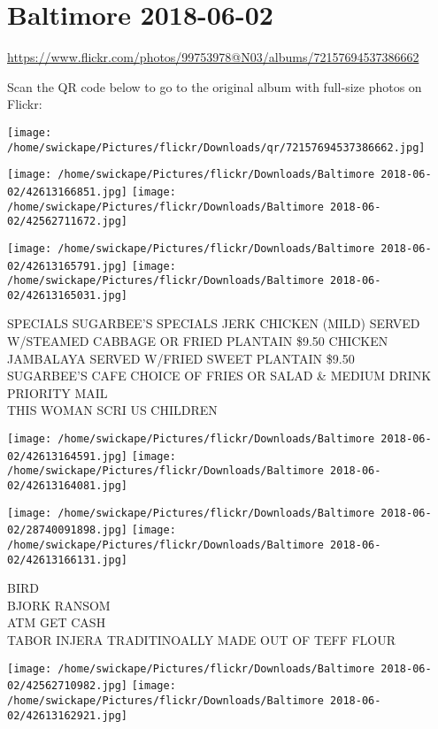 \documentclass[10pt,letterpaper]{article}
\title{}
\author{}
\date{}
\begin{document}
\section*{Baltimore 2018-06-02}

\url{https://www.flickr.com/photos/99753978@N03/albums/72157694537386662}

Scan the QR code below to go to the original album with full-size photos on Flickr:

\texttt{[image: /home/swickape/Pictures/flickr/Downloads/qr/72157694537386662.jpg]}
\pagebreak

\texttt{[image: /home/swickape/Pictures/flickr/Downloads/Baltimore 2018-06-02/42613166851.jpg]}
\texttt{[image: /home/swickape/Pictures/flickr/Downloads/Baltimore 2018-06-02/42562711672.jpg]}

\texttt{[image: /home/swickape/Pictures/flickr/Downloads/Baltimore 2018-06-02/42613165791.jpg]}
\texttt{[image: /home/swickape/Pictures/flickr/Downloads/Baltimore 2018-06-02/42613165031.jpg]}

SPECIALS SUGARBEE'S SPECIALS JERK CHICKEN (MILD) SERVED W/STEAMED CABBAGE OR FRIED PLANTAIN \$9.50 CHICKEN JAMBALAYA SERVED W/FRIED SWEET PLANTAIN \$9.50\\
SUGARBEE'S CAFE CHOICE OF FRIES OR SALAD \& MEDIUM DRINK\\
PRIORITY MAIL\\
THIS WOMAN SCRI US CHILDREN
\pagebreak

\texttt{[image: /home/swickape/Pictures/flickr/Downloads/Baltimore 2018-06-02/42613164591.jpg]}
\texttt{[image: /home/swickape/Pictures/flickr/Downloads/Baltimore 2018-06-02/42613164081.jpg]}

\texttt{[image: /home/swickape/Pictures/flickr/Downloads/Baltimore 2018-06-02/28740091898.jpg]}
\texttt{[image: /home/swickape/Pictures/flickr/Downloads/Baltimore 2018-06-02/42613166131.jpg]}

BIRD\\
BJORK RANSOM\\
ATM GET CASH\\
TABOR INJERA TRADITINOALLY MADE OUT OF TEFF FLOUR
\pagebreak

\texttt{[image: /home/swickape/Pictures/flickr/Downloads/Baltimore 2018-06-02/42562710982.jpg]}
\texttt{[image: /home/swickape/Pictures/flickr/Downloads/Baltimore 2018-06-02/42613162921.jpg]}
\end{document}
